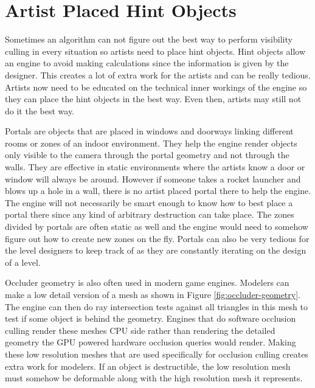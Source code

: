 \documentclass[12pt]{ucthesis}
\begin{document}
\section{Artist Placed Hint Objects}
\label{artist-placed-hint-objects}

Sometimes an algorithm can not figure out the best way to perform visibility culling in every situation so artists need to place hint objects.
Hint objects allow an engine to avoid making calculations since the information is given by the designer.
This creates a lot of extra work for the artists and can be really tedious.
Artists now need to be educated on the technical inner workings of the engine so they can place the hint objects in the best way.
Even then, artists may still not do it the best way.

Portals are objects that are placed in windows and doorways linking different rooms or zones of an indoor environment.\cite{Vis-Computations-Densely-Occluded, Doom3-source-review, Portal-culling}
They help the engine render objects only visible to the camera through the portal geometry and not through the walls.
They are effective in static environments where the artists know a door or window will always be around.
However if someone takes a rocket launcher and blows up a hole in a wall, there is no artist placed portal there to help the engine.
The engine will not necessarily be smart enough to know how to best place a portal there since any kind of arbitrary destruction can take place.
The zones divided by portals are often static as well and the engine would need to somehow figure out how to create new zones on the fly.
Portals can also be very tedious for the level designers to keep track of as they are constantly iterating on the design of a level.

Occluder geometry is also often used in modern game engines.
Modelers can make a low detail version of a mesh as shown in Figure \ref{fig:occluder-geometry}.\cite{culling-bf}
The engine can then do ray intersection tests against all triangles in this mesh to test if some object is behind the geometry.\cite{Cryengine-culling-explained}
Engines that do software occlusion culling render these meshes CPU side rather than rendering the detailed geometry the GPU powered hardware occlusion queries would render.
Making these low resolution meshes that are used specifically for occlusion culling creates extra work for modelers.
If an object is destructible, the low resolution mesh must somehow be deformable along with the high resolution mesh it represents.
\end{document}
